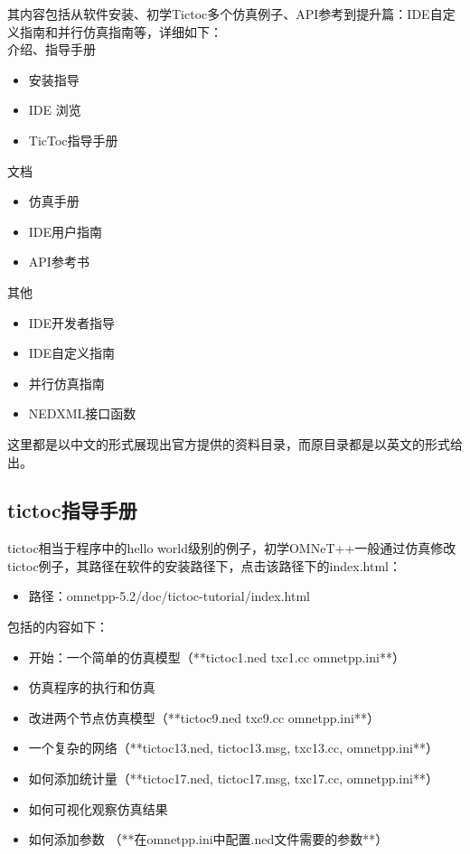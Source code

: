 其内容包括从软件安装、初学Tictoc多个仿真例子、API参考到提升篇：IDE自定义指南和并行仿真指南等，详细如下：\\

介绍、指导手册
\begin{itemize}
\item 安装指导
\item IDE 浏览
\item TicToc指导手册
\end{itemize}

文档
\begin{itemize}
	\item 仿真手册
	\item IDE用户指南
	\item API参考书
\end{itemize}

其他
\begin{itemize}
	\item IDE开发者指导
	\item IDE自定义指南
	\item 并行仿真指南
	\item NEDXML接口函数 
\end{itemize}

这里都是以中文的形式展现出官方提供的资料目录，而原目录都是以英文的形式给出。\\

\subsection{tictoc指导手册}
tictoc相当于程序中的hello world级别的例子，初学OMNeT++一般通过仿真修改tictoc例子，其路径在软件的安装路径下，点击该路径下的index.html：

\begin{itemize}
	\item 路径：omnetpp-5.2/doc/tictoc-tutorial/index.html 
\end{itemize}

包括的内容如下：
\begin{itemize}
	\item 开始：一个简单的仿真模型（**tictoc1.ned txc1.cc omnetpp.ini**）
	\item 仿真程序的执行和仿真
	\item 改进两个节点仿真模型（**tictoc9.ned txc9.cc omnetpp.ini**）
	\item 一个复杂的网络（**tictoc13.ned, tictoc13.msg, txc13.cc, omnetpp.ini**）
	\item 如何添加统计量（**tictoc17.ned, tictoc17.msg, txc17.cc, omnetpp.ini**）
	\item 如何可视化观察仿真结果
	\item 如何添加参数 （**在omnetpp.ini中配置.ned文件需要的参数**）\\
\end{itemize}

